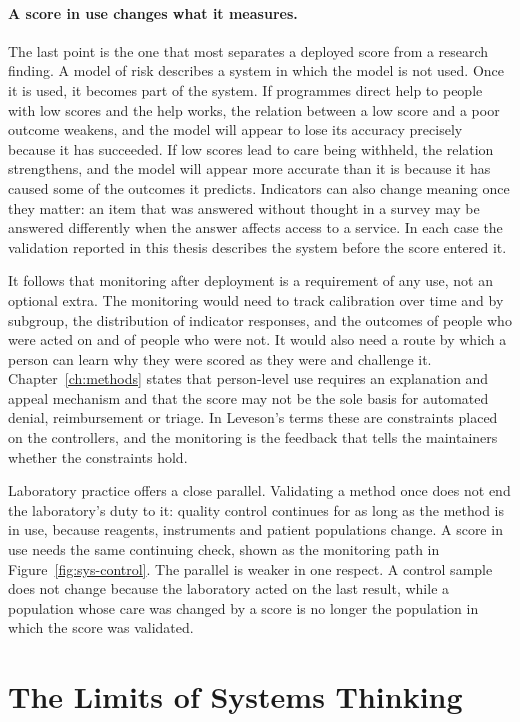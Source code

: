 \paragraph{A score in use changes what it measures.} The last point is the
one that most separates a deployed score from a research finding. A model of
risk describes a system in which the model is not used. Once it is used, it
becomes part of the system. If programmes direct help to people with low
scores and the help works, the relation between a low score and a poor
outcome weakens, and the model will appear to lose its accuracy precisely
because it has succeeded. If low scores lead to care being withheld, the
relation strengthens, and the model will appear more accurate than it is
because it has caused some of the outcomes it predicts. Indicators can also
change meaning once they matter: an item that was answered without thought
in a survey may be answered differently when the answer affects access to a
service. In each case the validation reported in this thesis describes the
system before the score entered it.

It follows that monitoring after deployment is a requirement of any use, not
an optional extra. The monitoring would need to track calibration over time
and by subgroup, the distribution of indicator responses, and the outcomes of
people who were acted on and of people who were not. It would also need a
route by which a person can learn why they were scored as they were and
challenge it. Chapter~\ref{ch:methods} states that person-level use requires an
explanation and appeal mechanism and that the score may not be the sole basis
for automated denial, reimbursement or triage. In Leveson's terms these are
constraints placed on the controllers, and the monitoring is the feedback that
tells the maintainers whether the constraints hold.

Laboratory practice offers a close parallel. Validating a method once does not
end the laboratory's duty to it: quality control continues for as long as the
method is in use, because reagents, instruments and patient populations
change. A score in use needs the same continuing check, shown as the
monitoring path in Figure~\ref{fig:sys-control}. The parallel is weaker in one
respect. A control sample does not change because the laboratory acted on the
last result, while a population whose care was changed by a score is no longer
the population in which the score was validated.

\section{The Limits of Systems Thinking}
\label{sec:sys-limits}

